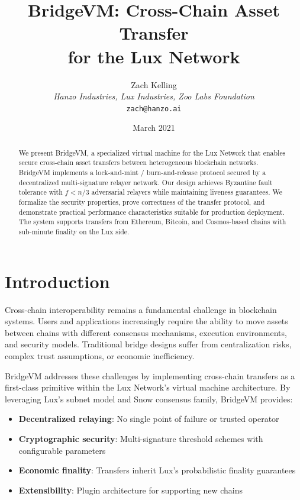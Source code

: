 \documentclass[11pt,a4paper]{article}
\title{\textbf{BridgeVM: Cross-Chain Asset Transfer\\for the Lux Network}}
\author{Zach Kelling\\
\textit{Hanzo Industries, Lux Industries, Zoo Labs Foundation}\\
\texttt{zach@hanzo.ai}}
\date{March 2021}
\theoremstyle{definition}
\begin{document}
\maketitle

\begin{abstract}
We present BridgeVM, a specialized virtual machine for the Lux Network that enables secure cross-chain asset transfers between heterogeneous blockchain networks. BridgeVM implements a lock-and-mint / burn-and-release protocol secured by a decentralized multi-signature relayer network. Our design achieves Byzantine fault tolerance with $f < n/3$ adversarial relayers while maintaining liveness guarantees. We formalize the security properties, prove correctness of the transfer protocol, and demonstrate practical performance characteristics suitable for production deployment. The system supports transfers from Ethereum, Bitcoin, and Cosmos-based chains with sub-minute finality on the Lux side.
\end{abstract}

\section{Introduction}

Cross-chain interoperability remains a fundamental challenge in blockchain systems. Users and applications increasingly require the ability to move assets between chains with different consensus mechanisms, execution environments, and security models. Traditional bridge designs suffer from centralization risks, complex trust assumptions, or economic inefficiency.

BridgeVM addresses these challenges by implementing cross-chain transfers as a first-class primitive within the Lux Network's virtual machine architecture. By leveraging Lux's subnet model and Snow consensus family, BridgeVM provides:

\begin{itemize}
    \item \textbf{Decentralized relaying}: No single point of failure or trusted operator
    \item \textbf{Cryptographic security}: Multi-signature threshold schemes with configurable parameters
    \item \textbf{Economic finality}: Transfers inherit Lux's probabilistic finality guarantees
    \item \textbf{Extensibility}: Plugin architecture for supporting new chains
\end{itemize}
\end{document}
